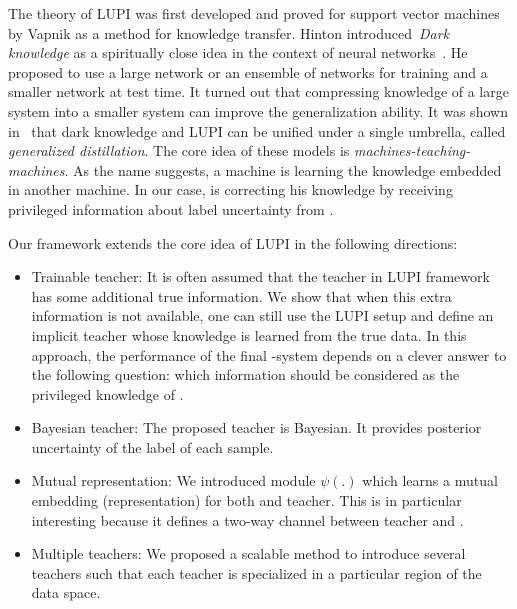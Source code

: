 The theory of LUPI was first developed and proved for support vector machines by Vapnik as a method for knowledge transfer. Hinton introduced~\emph{Dark knowledge} as a spiritually close idea in the context of neural networks~\citep{Hinton:2006}. He proposed to use a large network or an ensemble of networks for training and a smaller network at test time. It turned out that compressing knowledge of a large system into a smaller system can improve the generalization ability. It was shown 
in~\citep{lopez:2015} that dark knowledge and LUPI can be unified under a single umbrella, called \emph{generalized distillation}. The core idea of these models is \emph{machines-teaching-machines}. As the name suggests, a machine is learning the knowledge embedded in another machine. In our case, \std is correcting his knowledge by receiving privileged information about label uncertainty from \tch. 

Our framework extends the core idea of LUPI in the following directions:
\begin{itemize}[leftmargin=*]%
\setlength{\topsep}{0.1pt}
\setlength{\partopsep}{0.1pt}
\setlength{\itemsep}{0.1pt}
\setlength{\parskip}{0.1pt}
\setlength{\parsep}{0.1pt}
    \item Trainable teacher: It is often assumed that the teacher in LUPI framework has some additional true information. We show that when this extra information is not available, one can still use the LUPI setup and define an implicit teacher whose knowledge is learned from the true data. In this approach, the performance of the final \std-\tch system depends on a clever answer to the following question: which information should be considered as the privileged knowledge of \tch.
  \item Bayesian teacher: The proposed teacher is Bayesian. It provides posterior uncertainty of the label of each sample.
  \item Mutual representation: We introduced module $\psi(.)$ which learns a mutual embedding (representation) for both \std and teacher. This is in particular interesting because it defines a two-way channel between teacher and \std. 
  \item Multiple teachers: We proposed a scalable method to introduce several teachers such that each teacher is specialized in a particular region of the data space.
\end{itemize}